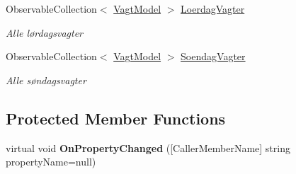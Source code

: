 \begin{DoxyCompactItemize}
Observable\+Collection$<$ \hyperlink{class__1aarsproeve_1_1_model_1_1_vagt_model}{Vagt\+Model} $>$ \hyperlink{class__1aarsproeve_1_1_view_model_1_1_vagtplan_view_model_ac577500fe1e779a03e689fed0af328c0}{Loerdag\+Vagter}
\begin{DoxyCompactList}\small\item\em Alle lørdagsvagter \end{DoxyCompactList}\item 
Observable\+Collection$<$ \hyperlink{class__1aarsproeve_1_1_model_1_1_vagt_model}{Vagt\+Model} $>$ \hyperlink{class__1aarsproeve_1_1_view_model_1_1_vagtplan_view_model_a86de4df58eaeaf4a435a2148b6332973}{Soendag\+Vagter}
\begin{DoxyCompactList}\small\item\em Alle søndagsvagter \end{DoxyCompactList}\end{DoxyCompactItemize}
\subsection*{Protected Member Functions}
\begin{DoxyCompactItemize}
\item 
\hypertarget{class__1aarsproeve_1_1_view_model_1_1_vagtplan_view_model_aa8227bf3edebc8faf6c6d4b622348f46}{}virtual void {\bfseries On\+Property\+Changed} (\mbox{[}Caller\+Member\+Name\mbox{]} string property\+Name=null)\label{class__1aarsproeve_1_1_view_model_1_1_vagtplan_view_model_aa8227bf3edebc8faf6c6d4b622348f46}

\end{DoxyCompactItemize}
